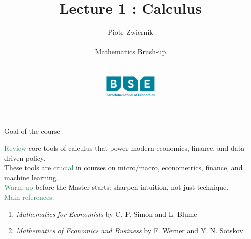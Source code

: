 \documentclass[11pt,aspectratio=169]{beamer}
\title[Calculus and Linear Algebra]{Lecture 1 : Calculus}
\author[Piotr Zwiernik, Barcelona School of Economics]{Piotr Zwiernik \\ $\;$\\
Mathematics Brush-up\\ $\;$\\ $\;$\\
\includegraphics[width=1in]{img/bse.png}  
}
\date{}
\begin{document}
\begin{frame}
\titlepage
\end{frame}





\begin{frame}{Goal of the course}

\textcolor{SeaGreen}{Review} core tools of calculus that power modern economics, finance, and data-driven policy.\\[6mm]

These tools are \textcolor{SeaGreen}{crucial} in courses on micro/macro, econometrics, finance, and machine learning.\\[6mm]

\textcolor{SeaGreen}{Warm up} before the Master starts: sharpen intuition, not just technique.\\[6mm]

\textcolor{SeaGreen}{Main references:} 
\begin{enumerate}
\item {\it Mathematics for Economists} by C. P. Simon and L. Blume
\item {\it Mathematics of Economics and Business} by F. Werner and Y. N. Sotskov
\end{enumerate}
\end{frame}
\end{document}
